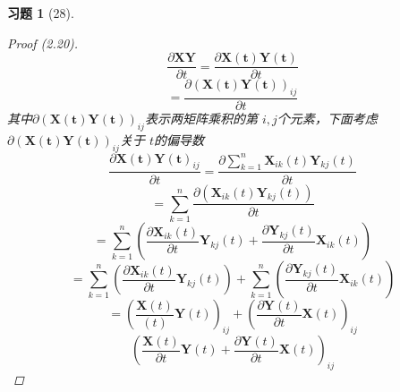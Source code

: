 \documentclass[a4paper, UTF8]{ctexart}
\newtheorem*{exercise}{\textbf{习题}}
\begin{document}
\begin{exercise}[28]
	\begin{proof}[Proof (2.20)]
		\begin{equation*}
			\frac{\partial \mathbf{XY}}{\partial t} = \frac{\partial \mathbf{X \left(t\right)}\mathbf{Y \left(t\right)}}{\partial t}
		\end{equation*}
		\begin{equation*}
			= \frac{ \partial \left( \mathbf{X \left( t \right) Y \left( t \right)} \right)_{ij} }{\partial t}
		\end{equation*}
		其中$\partial \left( \mathbf{X \left( t \right) Y \left( t \right)} \right)_{ij}$表示两矩阵乘积的第 $i,j$个元素，下面考虑$\partial \left( \mathbf{X \left( t \right) Y \left( t \right)} \right)_{ij}$关于 $t$的偏导数
		\begin{equation*}
			\frac{\partial \mathbf{X \left( t \right) Y \left( t \right)}_{ij} }{\partial t} = \frac{\partial \sum_{k=1}^n \mathbf{X}_{ik} \left( t \right)\mathbf{Y}_{kj} \left( t \right)}{\partial t}
		\end{equation*}
		\begin{equation*}
			= \sum_{k=1}^n \frac{\partial \left( \mathbf{X}_{ik}\left( t \right)\mathbf{Y}_{kj}\left( t \right) \right)}{\partial t}
		\end{equation*}
		\begin{equation*}
			= \sum_{k=1}^n\left( \frac{\partial\mathbf{X}_{ik}\left(t\right)}{\partial t}\mathbf{Y}_{kj}\left( t \right) + \frac{\partial \mathbf{Y}_{kj}\left( t \right)}{\partial t}\mathbf{X}_{ik}\left( t \right)\right)
		\end{equation*}
		\begin{equation*}
			= \sum_{k=1}^n \left( \frac{\partial \mathbf{X}_{ik} \left( t \right) }{\partial t}\mathbf{Y}_{kj}\left( t \right) \right) + \sum_{k=1}^n \left( \frac{\partial \mathbf{Y}_{kj}\left( t \right)}{\partial t} \mathbf{X}_{ik}\left( t \right)\right)
		\end{equation*}
		\begin{equation*}
			= \left( \frac{\mathbf{X}\left( t \right)}{\left( t \right)}\mathbf{Y} \left( t \right)\right)_{ij} + \left( \frac{\partial \mathbf{Y}\left( t \right)}{\partial t }\mathbf{X}\left( t \right)\right)_{ij}
		\end{equation*}
		\begin{equation*}
			\left( \frac{\mathbf{X}\left( t \right)}{\partial t}\mathbf{Y}\left( t \right) + \frac{\partial \mathbf{Y}\left( t \right)}{\partial t}\mathbf{X}\left( t \right)\right)_{ij}

\end{equation*}
\end{proof}
\end{exercise}
\end{document}
